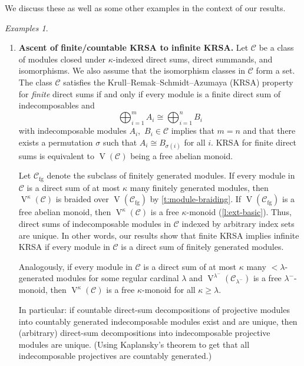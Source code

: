 \documentclass[a4paper,11pt,oneside]{amsart}
\theoremstyle{remark}
\newtheorem{examples}[teor]{Examples}
\newcommand{\cC}{\mathcal C}
\DeclareMathOperator{\Vmon}{V}
\begin{document}
We discuss these as well as some other examples in the context of our results.

\needspace{3cm}
\begin{examples} \label{e:module-examples} \mbox{} %
  \begin{enumerate}
  \item \textbf{Ascent of finite/countable KRSA to infinite KRSA.}
    Let $\cC$ be a class of modules closed under $\kappa$-indexed direct sums, direct summands, and isomorphisms.
    We also assume that the isomorphism classes in $\cC$ form a set.
    The class $\cC$ satisfies the Krull--Remak--Schmidt--Azumaya (KRSA) property for \emph{finite} direct sums if and only if every module is a finite direct sum of indecomposables and 
    \[
      \bigoplus_{i=1}^m A_i \cong \bigoplus_{i=1}^n B_i
    \]
    with indecomposable modules $A_i$,~$B_i \in \cC$ implies that $m=n$ and that there exists a permutation $\sigma$ such that $A_i \cong B_{\sigma(i)}$ for all $i$.
    KRSA for finite direct sums is equivalent to $\Vmon(\cC)$ being a free abelian monoid.

    Let $\cC_{\text{fg}}$ denote the subclass of finitely generated modules.
    If every module in $\cC$ is a direct sum of at most $\kappa$ many finitely generated modules, then $\Vmon^{\kappa}(\cC)$ is braided over $\Vmon(\cC_{\text{fg}})$ by \cref{t:module-braiding}.
    If $\Vmon(\cC_{\text{fg}})$ is a free abelian monoid, then $\Vmon^{\kappa}(\cC)$ is a free $\kappa$-monoid (\cref{l:ext-basic}).
    Thus, direct sums of indecomposable modules in $\cC$ indexed by arbitrary index sets are unique.
    In other words, our results show that finite KRSA implies infinite KRSA if every module in $\cC$ is a direct sum of finitely generated modules.

    Analogously, if every module in $\cC$ is a direct sum of at most $\kappa$ many $<\!\lambda$-generated modules for some regular cardinal $\lambda$ and $\Vmon^{\lambda^-}(\cC_{\lambda^-})$ is a free $\lambda^-$-monoid, then $\Vmon^{\kappa}(\cC)$ is a free $\kappa$-monoid for all $\kappa \ge \lambda$.
   
    In particular: if countable direct-sum decompositions of projective modules into countably generated indecomposable modules exist and are unique, then (arbitrary) direct-sum decompositions into indecomposable projective modules are unique. (Using Kaplansky's theorem to get that all indecomposable projectives are countably generated.)


\end{enumerate}
\end{examples}
\end{document}
